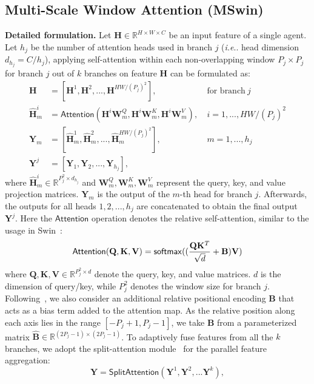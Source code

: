 \documentclass[runningheads]{llncs}
\makeatletter
\DeclareRobustCommand\onedot{\futurelet\@let@token\@onedot}
\def\@onedot{\ifx\@let@token.\else.\null\fi\xspace}
\def\ie{\emph{i.e}\onedot} \def\Ie{\emph{I.e}\onedot}
\makeatother
\begin{document}
\subsection{Multi-Scale Window Attention (MSwin)}
\label{sec:mswin}
\noindent\textbf{Detailed formulation.}
Let $\mathbf{H}\in\mathbb{R}^{H\times W\times C}$ be an input feature of a single agent. Let $h_j$ be the number of attention heads used in branch $j$ (\ie head dimension $d_{h_j}=C/h_j$), applying self-attention within each non-overlapping window $P_j\times P_j$ for branch $j$ out of $k$ branches on feature $\mathbf{H}$ can be formulated as:
\begin{align}
\label{eq:mswin-block}
\mathbf{H}&=[\mathbf{H}^1,\mathbf{H}^2,...,\mathbf{H}^{HW/(P_j)^2}],\ &\text{for branch}\ j\\
\hat{\mathbf{H}}^i_{m}&=\mathsf{Attention}(\mathbf{H}^i\mathbf{W}^Q_{m},\mathbf{H}^i\mathbf{W}^K_{m},\mathbf{H}^i\mathbf{W}^V_{m}),\ &i=1,...,HW/(P_j)^2
\\
\mathbf{Y}_{m}&=[\hat{\mathbf{H}}^1_{m},\hat{\mathbf{H}}^2_{m},...,\hat{\mathbf{H}}^{HW/(P_j)^2}_{m}], &m=1,...,h_j
\\
\mathbf{Y}^{j}&=[\mathbf{Y}_{1},\mathbf{Y}_{2},...,\mathbf{Y}_{h_j}],
\end{align}
where $\hat{\mathbf{H}}^i_m\in\mathbb{R}^{P_j^2\times d_{h_j}}$ and $\mathbf{W}^Q_m,\mathbf{W}^K_m,\mathbf{W}^V_m$ represent the query, key, and value projection matrices. $\mathbf{Y}_{m}$ is the output of the $m$-th head for branch $j$. Afterwards, the outputs for all heads $1,2,...,h_j$ are concatenated to obtain the final output $\mathbf{Y}^j$. Here the $\mathsf{Attention}$ operation denotes the relative self-attention, similar to the usage in Swin~\cite{liu2021swin}:
\vspace{-2mm}
\begin{equation}
\label{eq:attention}
\mathsf{Attention}(\mathbf{Q},\mathbf{K},\mathbf{V})=\mathsf{softmax}((\frac{\mathbf{Q}\mathbf{K}^T}{\sqrt{d}}+\mathbf{B})\mathbf{V})
\vspace{-2mm}
\end{equation}
where $\mathbf{Q},\mathbf{K},\mathbf{V}\in\mathbb{R}^{P_j^2\times d}$ denote the query, key, and value matrices. $d$ is the dimension of query/key, while $P_j^2$ denotes the window size for branch $j$.
Following~\cite{liu2021swin,hu2019local}, we also consider an additional relative positional encoding $\mathbf{B}$ that acts as a bias term added to the attention map. As the relative position along each axis lies in the range $[-P_j+1,P_j-1]$,  we take $\mathbf{B}$ from a parameterized matrix $\hat{\mathbf{B}}\in\mathbb{R}^{(2P_j-1)\times(2P_j-1)}$.
To adaptively fuse features from all the $k$ branches, we adopt the split-attention module~\cite{zhang2020resnest} for the parallel feature aggregation:
\begin{equation}
\label{eq:split-attention}
\mathbf{Y}=\mathsf{SplitAttention}(\mathbf{Y}^{1},\mathbf{Y}^{2},...\mathbf{Y}^{k}),
\end{equation}
\end{document}
